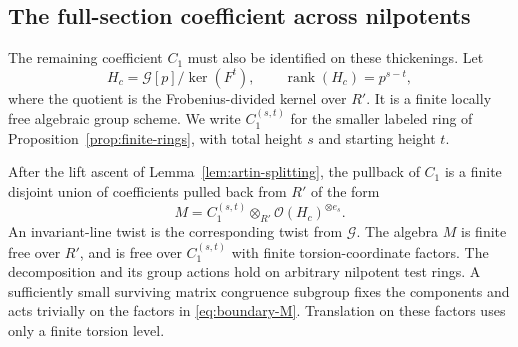 \subsection{The full-section coefficient across nilpotents}

The remaining coefficient $C_1$ must also be identified on these
thickenings.  Let
\[
 H_c=\mathcal G[p]/\ker(F^t),
 \qquad \operatorname{rank}(H_c)=p^{s-t},
\]
where the quotient is the Frobenius-divided kernel over $R'$.
It is a finite locally free algebraic group scheme.  We write
$C_1^{(s,t)}$ for the smaller labeled ring of
Proposition~\ref{prop:finite-rings}, with total height $s$ and starting
height $t$.

\begin{lemma}
\label{lem:full-sections}
After the lift ascent of Lemma~\ref{lem:artin-splitting}, the pullback
of $C_1$ is a finite disjoint union of coefficients pulled back from
$R'$ of the form
\begin{equation}
 \label{eq:boundary-M}
 M=C_1^{(s,t)}\otimes_{R'}
       \mathcal O(H_c)^{\otimes e_s}.
\end{equation}
An invariant-line twist is the corresponding twist from
$\mathcal G$.  The algebra $M$ is finite free over $R'$, and is free
over $C_1^{(s,t)}$ with finite torsion-coordinate factors.  The
decomposition and its group actions hold on arbitrary nilpotent
test rings.  A sufficiently small surviving matrix congruence
subgroup fixes the components and acts trivially on the factors in
\eqref{eq:boundary-M}.  Translation on these factors uses only a
finite torsion level.
\end{lemma}

